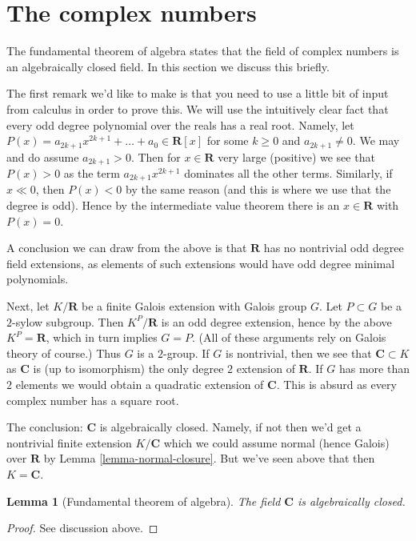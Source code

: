 \documentclass[10pt,a4paper]{amsart}
\theoremstyle{plain}
\newtheorem{lemma}[subsection]{Lemma}
\theoremstyle{definition}
\theoremstyle{remark}
\numberwithin{equation}{subsection}
\begin{document}
\section{The complex numbers}
\label{section-complex-numbers}

\noindent
The fundamental theorem of algebra states that the field of complex numbers
is an algebraically closed field. In this section we discuss this
briefly.

\medskip\noindent
The first remark we'd like to make is that you need to use a little
bit of input from calculus in order to prove this. We will use the
intuitively clear fact that every odd degree polynomial over
the reals has a real root. Namely, let
$P(x) = a_{2k + 1} x^{2k + 1} + \ldots + a_0 \in \mathbf{R}[x]$
for some $k \geq 0$ and $a_{2k + 1} \not = 0$.
We may and do assume $a_{2k + 1} > 0$. Then for $x \in \mathbf{R}$
very large (positive) we see that $P(x) > 0$ as the term
$a_{2k + 1} x^{2k + 1}$ dominates all the other terms. Similarly,
if $x \ll 0$, then $P(x) < 0$ by the same reason (and this is where
we use that the degree is odd). Hence by the intermediate value
theorem there is an $x \in \mathbf{R}$ with $P(x) = 0$.

\medskip\noindent
A conclusion we can draw from the above is that $\mathbf{R}$ has
no nontrivial odd degree field extensions, as elements of such extensions
would have odd degree minimal polynomials.

\medskip\noindent
Next, let $K/\mathbf{R}$ be a finite Galois extension with Galois group $G$.
Let $P \subset G$ be a $2$-sylow subgroup. Then $K^P/\mathbf{R}$ is an
odd degree extension, hence by the above $K^P = \mathbf{R}$,
which in turn implies
$G = P$. (All of these arguments rely on Galois theory of course.)
Thus $G$ is a $2$-group. If $G$ is nontrivial, then we see that
$\mathbf{C} \subset K$ as $\mathbf{C}$ is (up to isomorphism) the only
degree $2$ extension of $\mathbf{R}$. If $G$ has more than $2$ elements
we would obtain a quadratic extension of $\mathbf{C}$.
This is absurd as every complex number has a square root.

\medskip\noindent
The conclusion: $\mathbf{C}$ is algebraically closed. Namely, if not
then we'd get a nontrivial finite extension $K/\mathbf{C}$
which we could assume normal (hence Galois) over $\mathbf{R}$ by
Lemma \ref{lemma-normal-closure}. But we've seen above that then
$K = \mathbf{C}$.

\begin{lemma}[Fundamental theorem of algebra]
\label{lemma-C-algebraically-closed}
The field $\mathbf{C}$ is algebraically closed.
\end{lemma}

\begin{proof}
See discussion above.
\end{proof}
\end{document}
